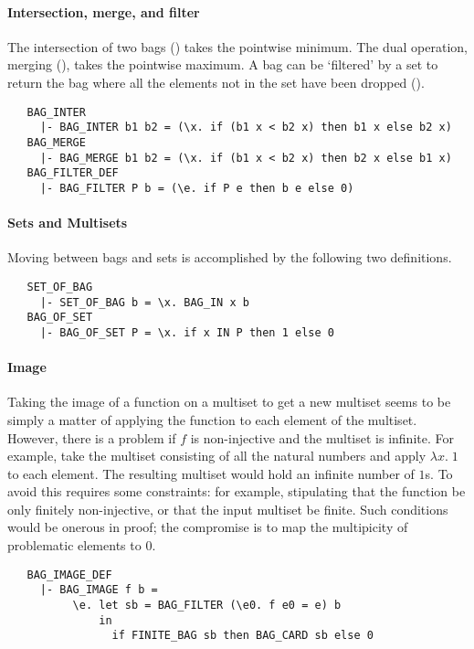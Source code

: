\paragraph {Intersection, merge, and filter}

The intersection of two bags () takes the pointwise
minimum. The dual operation, merging (), takes the
pointwise maximum. A bag can be `filtered' by a set to return the bag
where all the elements not in the set have been dropped
().
%
\begin{hol}
\begin{verbatim}
   BAG_INTER
     |- BAG_INTER b1 b2 = (\x. if (b1 x < b2 x) then b1 x else b2 x)
   BAG_MERGE
     |- BAG_MERGE b1 b2 = (\x. if (b1 x < b2 x) then b2 x else b1 x)
   BAG_FILTER_DEF
     |- BAG_FILTER P b = (\e. if P e then b e else 0)
\end{verbatim}
\end{hol}

\paragraph {Sets and Multisets}

Moving between bags and sets is accomplished by the following two
definitions.
%
\begin{hol}
\begin{verbatim}
   SET_OF_BAG
     |- SET_OF_BAG b = \x. BAG_IN x b
   BAG_OF_SET
     |- BAG_OF_SET P = \x. if x IN P then 1 else 0
\end{verbatim}
\end{hol}

\paragraph {Image}

Taking the image of a function on a multiset to get a new multiset
seems to be simply a matter of applying the function to each element
of the multiset. However, there is a problem if $f$ is non-injective
and the multiset is infinite. For example, take the multiset
consisting of all the natural numbers and apply $\lambda x.\; 1$ to
each element. The resulting multiset would hold an infinite number of
$1$s. To avoid this requires some constraints: for example,
stipulating that the function be only finitely non-injective, or that
the input multiset be finite. Such conditions would be onerous in
proof; the compromise is to map the multipicity of problematic
elements to $0$.
%
\begin{hol}
\begin{verbatim}
   BAG_IMAGE_DEF
     |- BAG_IMAGE f b =
          \e. let sb = BAG_FILTER (\e0. f e0 = e) b
              in
                if FINITE_BAG sb then BAG_CARD sb else 0
\end{verbatim}
\end{hol}



